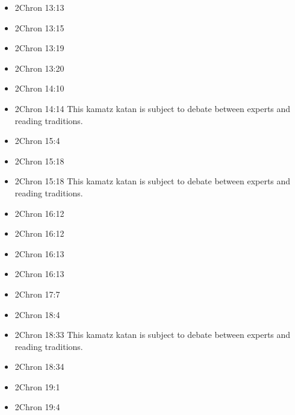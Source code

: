 \documentclass[14pt]{book}
\begin{document}
\begin{multicols}{2}
\begin{itemize}
				\item 2Chron 13:13
				
				\item 2Chron 13:15
				
				\item 2Chron 13:19
				
				\item 2Chron 13:20
				
				\item 2Chron 14:10
				
				\item 2Chron 14:14 This kamatz katan is subject to debate between experts and reading traditions.
				
				\item 2Chron 15:4
				
				\item 2Chron 15:18
				
				\item 2Chron 15:18 This kamatz katan is subject to debate between experts and reading traditions.
				
				\item 2Chron 16:12
				
				\item 2Chron 16:12
				
				\item 2Chron 16:13
				
				\item 2Chron 16:13
				
				\item 2Chron 17:7
				
				\item 2Chron 18:4
				
				\item 2Chron 18:33 This kamatz katan is subject to debate between experts and reading traditions.
				
				\item 2Chron 18:34
				
				\item 2Chron 19:1
				
				\item 2Chron 19:4
				

\end{itemize}
\end{multicols}
\end{document}

